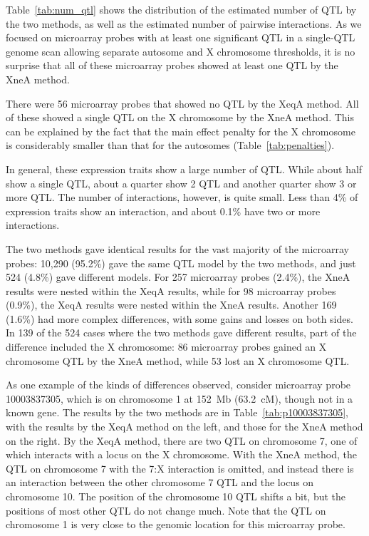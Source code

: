 \documentclass[12pt,letterpaper]{article}
\begin{document}
Table~\ref{tab:num_qtl} shows the distribution of the estimated number
of QTL by the two methods, as well as the estimated number of pairwise
interactions. As we focused on microarray probes with at least one
significant QTL in a single-QTL genome scan allowing separate autosome
and X chromosome thresholds, it is no surprise that all of these
microarray probes showed at least one QTL by the XneA method.

There were 56 microarray probes that showed no QTL by the XeqA method.
All of these showed a single QTL on the X chromosome by the XneA
method. This can be explained by the fact that the main effect penalty
for the X chromosome is considerably smaller than that for the
autosomes (Table~\ref{tab:penalties}).

In general, these expression traits show a large number of QTL. While
about half show a single QTL, about a quarter show 2 QTL and another
quarter show 3 or more QTL. The number of interactions, however, is
quite small. Less than 4\% of expression traits show an interaction,
and about 0.1\% have two or more interactions.

The two methods gave identical results for the vast majority of the
microarray probes: 10,290 (95.2\%) gave the same QTL model by the two
methods, and just 524 (4.8\%) gave different models. For 257
microarray probes (2.4\%), the XneA results were nested within the
XeqA results, while for 98 microarray probes (0.9\%), the XeqA results
were nested within the XneA results. Another 169 (1.6\%) had more
complex differences, with some gains and losses on both sides.
In 139 of the 524 cases where the two methods gave different results,
part of the difference included the X chromosome: 86 microarray probes
gained an X chromosome QTL by the XneA method, while 53 lost an X
chromosome QTL.

As one example of the kinds of differences observed, consider
microarray probe 10003837305, which is on chromosome 1 at 152~Mb
(63.2~cM), though not in a known gene. The results by the two methods
are in Table~\ref{tab:p10003837305}, with the results by the XeqA
method on the left, and those for the XneA method on the right.
By the XeqA method, there are two QTL on chromosome 7, one of which
interacts with a locus on the X chromosome. With the XneA method, the
QTL on chromosome 7 with the 7:X interaction is omitted, and instead
there is an interaction between the other chromosome 7 QTL and the
locus on chromosome 10. The position of the chromosome 10 QTL shifts a
bit, but the positions of most other QTL do not change much. Note that
the QTL on chromosome 1 is very close to the genomic location for this
microarray probe.
\end{document}
